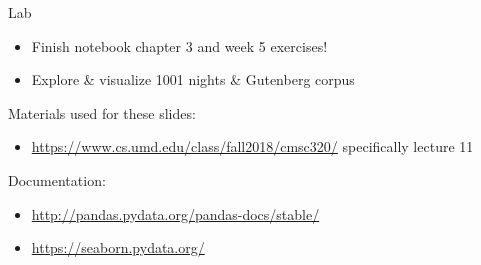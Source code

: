 \documentclass[aspectratio=169,usenames,dvipsnames]{beamer}
\begin{document}

\begin{frame}{Lab}
\begin{itemize}
    \item Finish notebook chapter 3 and week 5 exercises!
    \item Explore \& visualize 1001 nights \& Gutenberg corpus
\end{itemize}
\end{frame}

\begin{frame}
Materials used for these slides:
\begin{itemize}
\item \url{https://www.cs.umd.edu/class/fall2018/cmsc320/}
    specifically lecture 11
\end{itemize}

\vspace{1em}
Documentation:
\begin{itemize}
    \item \url{http://pandas.pydata.org/pandas-docs/stable/}
    \item \url{https://seaborn.pydata.org/}
\end{itemize}
\end{frame}
\end{document}
